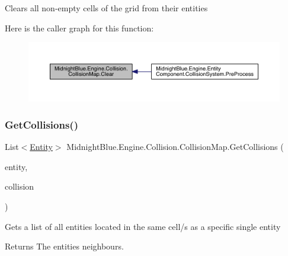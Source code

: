 Clears all non-\/empty cells of the grid from their entities 

Here is the caller graph for this function\+:
\nopagebreak
\begin{figure}[H]
\begin{center}
\leavevmode
\includegraphics[width=350pt]{class_midnight_blue_1_1_engine_1_1_collision_1_1_collision_map_ab8ef33abaee3cfbe9f15dd73fda3cf6e_icgraph}
\end{center}
\end{figure}
\hypertarget{class_midnight_blue_1_1_engine_1_1_collision_1_1_collision_map_ac6cb425b42914d6035b917d056ad8773}{}\label{class_midnight_blue_1_1_engine_1_1_collision_1_1_collision_map_ac6cb425b42914d6035b917d056ad8773} 
\subsubsection{\texorpdfstring{Get\+Collisions()}{GetCollisions()}}
{\footnotesize\ttfamily List$<$\hyperlink{class_midnight_blue_1_1_engine_1_1_entity_component_1_1_entity}{Entity}$>$ Midnight\+Blue.\+Engine.\+Collision.\+Collision\+Map.\+Get\+Collisions (\begin{DoxyParamCaption}\item[{\hyperlink{class_midnight_blue_1_1_engine_1_1_entity_component_1_1_entity}{Entity}}]{entity,  }\item[{\hyperlink{class_midnight_blue_1_1_engine_1_1_entity_component_1_1_collision_component}{Collision\+Component}}]{collision }\end{DoxyParamCaption})\hspace{0.3cm}{\ttfamily [inline]}}



Gets a list of all entities located in the same cell/s as a specific single entity 

\begin{DoxyReturn}{Returns}
The entities neighbours.
\end{DoxyReturn}

